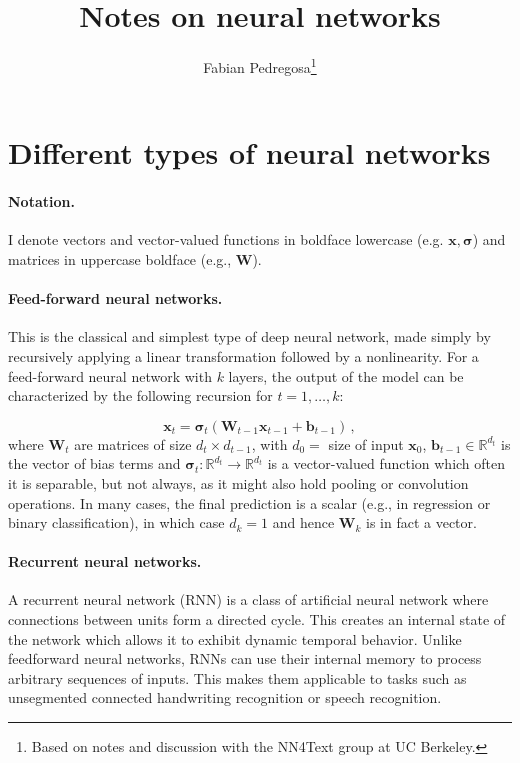\documentclass[paper=a4, fontsize=11pt,twoside, abstracton]{scrartcl}
\date{\vspace{-5ex}}
\title{Notes on neural networks}
\author{Fabian Pedregosa\thanks{Based on notes and discussion with the NN4Text group at UC Berkeley.}}
\def\RR{{\mathbb R}}
\def\xx{{\boldsymbol x}}
\def\WW{{\boldsymbol W}}
\def\ssigma{{\boldsymbol \sigma}}
\begin{document}
\maketitle




\section{Different types of neural networks}


\paragraph{Notation.} I denote vectors and vector-valued functions in boldface lowercase (e.g. $\xx, \ssigma$) and matrices in uppercase boldface (e.g., $\WW$).

\paragraph{Feed-forward neural networks.} This is the classical and simplest type of deep neural network, made simply by recursively applying a linear transformation followed by a nonlinearity. For a feed-forward neural network with $k$ layers, the output of the model can be characterized by the following recursion for $t=1, \ldots, k$:

\begin{equation}\label{eq:feed_forward}
  \xx_{t} = \ssigma_t(\boldsymbol{W}_{t-1} \xx_{t-1} + \boldsymbol{b}_{t-1}) \,,
\end{equation}
where $\WW_{t}$ are matrices of size $d_{t} \times d_{t-1}$, with $d_0 = $ size of input $\xx_0$, $\boldsymbol{b}_{t-1} \in \RR^{d_t}$ is the vector of bias terms and $\ssigma_t: \RR^{d_t} \to  \RR^{d_t}$ is a vector-valued function which often it is separable, but not always, as it might also hold pooling or convolution operations. In many cases, the final prediction is a scalar (e.g., in regression or binary classification), in which case $d_k = 1$ and hence $\WW_k$
is in fact a vector.

\paragraph{Recurrent neural networks.} A recurrent neural network (RNN) is a class of artificial neural network where connections between units form a directed cycle. This creates an internal state of the network which allows it to exhibit dynamic temporal behavior. Unlike feedforward neural networks, RNNs can use their internal memory to process arbitrary sequences of inputs. This makes them applicable to tasks such as unsegmented connected handwriting recognition or speech recognition.
\end{document}
